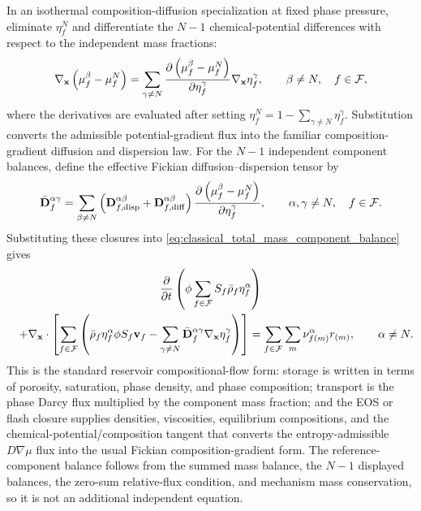 In an isothermal composition-diffusion specialization at fixed phase pressure,
eliminate \(\eta_f^N\) and differentiate the \(N-1\) chemical-potential
differences with respect to the independent mass fractions:
%
\begin{equation}
	\nabla_{\mathbf{x}}
	\left(
	\mu_f^\beta-\mu_f^N
	\right)
	=
	\sum_{\gamma\ne N}
	\frac{
		\partial
		\left(
		\mu_f^\beta-\mu_f^N
		\right)
	}{
		\partial\eta_f^\gamma
	}
	\nabla_{\mathbf{x}}\eta_f^\gamma ,
	\qquad
	\beta\ne N,\quad f\in\mathcal{F},
	\label{eq:composition_gradient_chemical_potential_tangent}
\end{equation}
%
where the derivatives are evaluated after setting
\(\eta_f^N=1-\sum_{\gamma\ne N}\eta_f^\gamma\).  Substitution converts the
admissible potential-gradient flux into the familiar composition-gradient
diffusion and dispersion law.  For the \(N-1\) independent component balances,
define the effective Fickian diffusion--dispersion tensor by
%
\begin{equation}
	\bar{\mathbf{D}}_{f}^{\alpha\gamma}
	=
	\sum_{\beta\ne N}
	\left(
	\mathbf{D}_{f,{\rm disp}}^{\alpha\beta}
	+
	\mathbf{D}_{f,{\rm diff}}^{\alpha\beta}
	\right)
	\frac{
		\partial
		\left(
		\mu_f^\beta-\mu_f^N
		\right)
	}{
		\partial\eta_f^\gamma
	},
	\qquad
	\alpha,\gamma\ne N,\quad f\in\mathcal{F} .
	\label{eq:effective_fickian_diffusion_dispersion_tensor}
\end{equation}
%
Substituting these closures into
\eqref{eq:classical_total_mass_component_balance} gives
%
\begin{multline}
	\frac{\partial}{\partial t}
	\left(\phi\sum_{f\in\mathcal{F}}S_f\bar\rho_f\eta_f^\alpha\right)
	\\
	\quad
	+
	\nabla_{\mathbf{x}}\cdot
	\left[
	\sum_{f\in\mathcal{F}}
	\left(
	\bar\rho_f\eta_f^\alpha
	\phi S_f\mathbf{v}_f
	-
			\sum_{\gamma\ne N}
			\bar{\mathbf{D}}_{f}^{\alpha\gamma}
			\nabla_{\mathbf{x}}\eta_f^\gamma
	\right)
		\right]
		=
			  \sum_{f\in\mathcal{F}}\sum_m\nu_{f (m)}^\alpha r_{(m)},
		\qquad
		\alpha\ne N.
	\label{eq:classical_compositional_fickian_balance}
\end{multline}
%
This is the standard reservoir compositional-flow form: storage is written in
terms of porosity, saturation, phase density, and phase composition; transport is
the phase Darcy flux multiplied by the component mass fraction; and the EOS or
flash closure supplies densities, viscosities, equilibrium compositions, and
the chemical-potential/composition tangent that converts the
entropy-admissible \(D\nabla\mu\) flux into the usual Fickian
composition-gradient form.  The reference-component balance follows from the
summed mass balance, the \(N-1\) displayed balances, the zero-sum relative-flux
condition, and mechanism mass conservation, so it is not an additional
independent equation.

